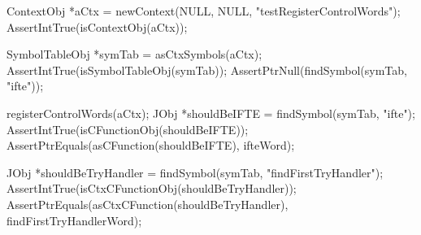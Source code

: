 \startCTest
  ContextObj *aCtx = newContext(NULL, NULL, "testRegisterControlWords");
  AssertIntTrue(isContextObj(aCtx));
  
  SymbolTableObj *symTab = asCtxSymbols(aCtx);
  AssertIntTrue(isSymbolTableObj(symTab));
  AssertPtrNull(findSymbol(symTab, "ifte"));
  
  registerControlWords(aCtx);
  JObj *shouldBeIFTE = findSymbol(symTab, "ifte");
  AssertIntTrue(isCFunctionObj(shouldBeIFTE));
  AssertPtrEquals(asCFunction(shouldBeIFTE), ifteWord);
  
  JObj *shouldBeTryHandler = findSymbol(symTab, "findFirstTryHandler");
  AssertIntTrue(isCtxCFunctionObj(shouldBeTryHandler));
  AssertPtrEquals(asCtxCFunction(shouldBeTryHandler), findFirstTryHandlerWord);
\stopCTest
\stopTestCase
\stopTestSuite